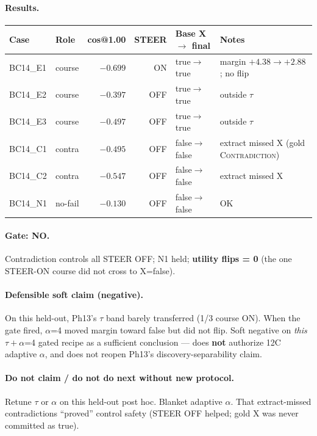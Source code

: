 \documentclass[11pt,a4paper]{article}
\newcommand{\con}{\textsc{Contradiction}}
\begin{document}
\paragraph{Results.}
\begin{center}
\small
\begin{tabular}{llrrll}
\toprule
Case & Role & cos@1.00 & STEER & Base X $\rightarrow$ final & Notes \\
\midrule
BC14\_E1 & course & $-0.699$ & ON & true$\rightarrow$true & margin $+4.38\rightarrow+2.88$; no flip \\
BC14\_E2 & course & $-0.397$ & OFF & true$\rightarrow$true & outside $\tau$ \\
BC14\_E3 & course & $-0.497$ & OFF & true$\rightarrow$true & outside $\tau$ \\
BC14\_C1 & contra & $-0.495$ & OFF & false$\rightarrow$false & extract missed X (gold \con) \\
BC14\_C2 & contra & $-0.547$ & OFF & false$\rightarrow$false & extract missed X \\
BC14\_N1 & no-fail & $-0.130$ & OFF & false$\rightarrow$false & OK \\
\bottomrule
\end{tabular}
\end{center}

\paragraph{Gate: NO.}
Contradiction controls all STEER OFF; N1 held; \textbf{utility flips = 0} (the one STEER-ON course did not cross to X=false).

\paragraph{Defensible soft claim (negative).}
On this held-out, Ph13's $\tau$ band barely transferred (1/3 course ON). When the gate fired, $\alpha$=4 moved margin toward false but did not flip. Soft negative on \emph{this} $\tau{+}\alpha$=4 gated recipe as a sufficient conclusion --- does \textbf{not} authorize 12C adaptive $\alpha$, and does not reopen Ph13's discovery-separability claim.

\paragraph{Do not claim / do not do next without new protocol.}
Retune $\tau$ or $\alpha$ on this held-out post hoc. Blanket adaptive $\alpha$. That extract-missed contradictions ``proved'' control safety (STEER OFF helped; gold X was never committed as true).
\end{document}
